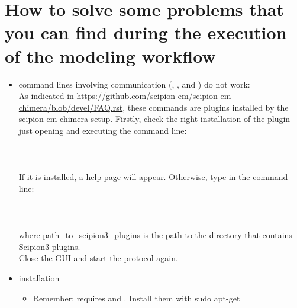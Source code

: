 \section{How to solve some problems that you can find during the execution of the modeling workflow}
\label{problems}

\begin{itemize}
 
 \item \chimera command lines involving \scipion communication (, ,  and ) do not work:\\
 As indicated in \url{https://github.com/scipion-em/scipion-em-chimera/blob/devel/FAQ.rst}, these commands are \chimerax plugins installed by the scipion-em-chimera setup. Firstly, check the right installation of the plugin just opening \chimera and executing the command line:\\ 
 \\ \\ 
 \\If it is installed, a help page will appear. Otherwise, type in the command line:\\ \\ \\ 
 \\where path\_to\_scipion3\_plugins is the path to the directory that contains Scipion3 plugins.\\
 Close the \chimera GUI and start the protocol again.

 \item {} installation
        \begin{itemize}
        \item Remember:  requires  and . Install them with sudo apt-get
        \end{itemize}

 
\end{itemize}
